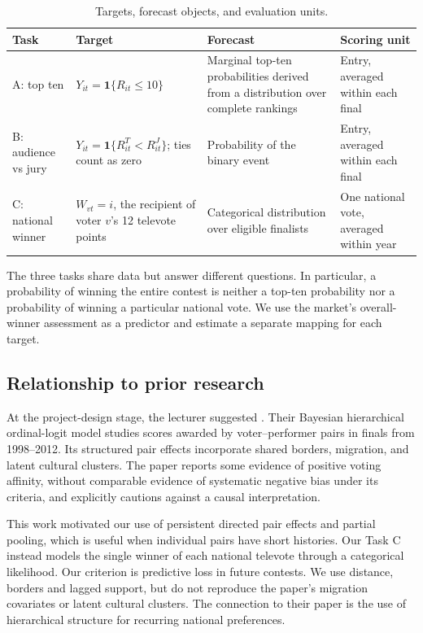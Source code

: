 \documentclass[11pt,a4paper]{article}
\begin{document}
\begin{table}[H]\centering\small
\caption{Targets, forecast objects, and evaluation units.}\label{tab:targets}
\begin{tabularx}{\linewidth}{lYYY}
\toprule
Task & Target & Forecast & Scoring unit\\\midrule
A: top ten & $Y_{it}=\mathbf1\{R_{it}\leq10\}$ & Marginal top-ten probabilities derived from a distribution over complete rankings & Entry, averaged within each final\\
B: audience vs jury & $Y_{it}=\mathbf1\{R^{T}_{it}<R^{J}_{it}\}$; ties count as zero & Probability of the binary event & Entry, averaged within each final\\
C: national winner & $W_{vt}=i$, the recipient of voter $v$'s 12 televote points & Categorical distribution over eligible finalists & One national vote, averaged within year\\\bottomrule
\end{tabularx}
\end{table}

The three tasks share data but answer different questions. In particular, a probability of winning the entire contest is neither a top-ten probability nor a probability of winning a particular national vote. We use the market's overall-winner assessment as a predictor and estimate a separate mapping for each target.

\subsection{Relationship to prior research}
At the project-design stage, the lecturer suggested \citet{blangiardo2014}. Their Bayesian hierarchical ordinal-logit model studies scores awarded by voter--performer pairs in finals from 1998--2012. Its structured pair effects incorporate shared borders, migration, and latent cultural clusters. The paper reports some evidence of positive voting affinity, without comparable evidence of systematic negative bias under its criteria, and explicitly cautions against a causal interpretation.

This work motivated our use of persistent directed pair effects and partial pooling, which is useful when individual pairs have short histories. Our Task C instead models the single winner of each national televote through a categorical likelihood. Our criterion is predictive loss in future contests. We use distance, borders and lagged support, but do not reproduce the paper's migration covariates or latent cultural clusters. The connection to their paper is the use of hierarchical structure for recurring national preferences.
\end{document}
